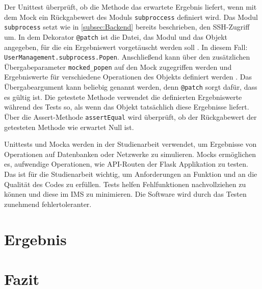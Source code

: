 \documentclass[a4paper,titlepage,halfparskip,12pt]{scrreprt}
\begin{document}
\begin{onehalfspacing}
Der Unittest überprüft, ob die Methode das erwartete Ergebnis liefert, wenn mit dem Mock ein Rückgabewert des Moduls \texttt{subproccess} definiert wird. Das Modul \texttt{subprocess} setzt wie in \autoref{subsec:Backend} bereits beschrieben, den \acs{SSH}-Zugriff um. In dem Dekorator \texttt{@patch} ist die Datei, das Modul und das Objekt angegeben, für die ein Ergebniswert vorgetäuscht werden soll \cite{hubertz2016softwaretests}. In diesem Fall: \texttt{UserManagement.subprocess.Popen}. Anschließend kann über den zusätzlichen Übergabeparameter \texttt{mocked\_popen} auf den Mock zugegriffen werden und Ergebniswerte für verschiedene Operationen des Objekts definiert werden \cite{hubertz2016softwaretests}. Das Übergabeargument kann beliebig genannt werden, denn \texttt{@patch} sorgt dafür, dass es gültig ist. Die getestete Methode verwendet die definierten Ergebniswerte während des Tests so, als wenn das Objekt tatsächlich diese Ergebnisse liefert. Über die Assert-Methode \texttt{assertEqual} wird überprüft, ob der Rückgabewert der getesteten Methode wie erwartet Null ist.

\pagebreak

Unittests und Mocka werden in der Studienarbeit verwendet, um Ergebnisse von Operationen auf Datenbanken oder Netzwerke zu simulieren. Mocks ermöglichen es, aufwendige Operationen, wie \acs{API}-Routen der Flask Applikation zu testen. Das ist für die Studienarbeit wichtig, um Anforderungen an Funktion und an die Qualität des Codes zu erfüllen. Tests helfen Fehlfunktionen nachvollziehen zu können und diese im \acs{IMS} zu minimieren. Die Software wird durch das Testen zunehmend fehlertoleranter.

\pagebreak

\chapter{Ergebnis}
\label{chap:Ergebnis}

\newpage

\chapter{Fazit}
\label{chap:Fazit}


\end{onehalfspacing}
\newpage


\newpage
\appendix
{}
\end{document}
